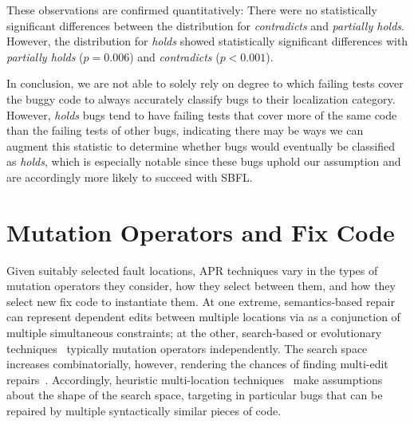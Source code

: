 \documentclass[10pt, conference]{IEEEtran}
\begin{document}
These observations are confirmed quantitatively: There were no statistically significant 
differences between the distribution for \emph{contradicts} and \emph{partially holds}. 
However, the distribution for \emph{holds} showed statistically significant differences with 
\emph{partially holds} ($p = 0.006$)  and \emph{contradicts} ($p < 0.001$).

In conclusion, 
we are not able to solely rely on degree to which failing tests cover the buggy 
code to always accurately classify bugs to their localization category.
However, \emph{holds} bugs tend to have failing tests that cover more of the 
same code than the failing tests of other bugs, indicating 
there may be ways we can augment this statistic to determine whether bugs would eventually 
be classified as \emph{holds}, which is 
especially notable since these bugs uphold our assumption and are accordingly more likely to 
succeed with SBFL.
 
\section{Mutation Operators and Fix Code}
\label{sec:mutops}

Given suitably selected fault locations, APR techniques vary in the types of
mutation operators they consider, how they select between them, and how they
select new fix code to instantiate them. 
%
At one extreme, semantics-based repair~\cite{s3,angelix} can represent dependent edits between multiple
locations via as a conjunction of multiple simultaneous constraints; at the other, 
search-based or
evolutionary techniques~\cite{genprog,par} typically mutation
operators independently. 
The search space increases combinatorially, however, rendering
the chances of finding multi-edit repairs~\cite{ae,long-search-spaces}. Accordingly, heuristic multi-location
techniques~\cite{saha2019harnessing} make assumptions about the 
shape of the search space, 
targeting in particular bugs that can be repaired by multiple syntactically similar pieces of
code.
\end{document}
